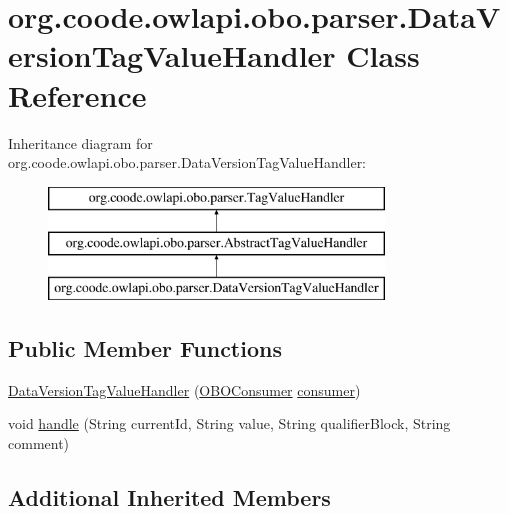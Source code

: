 \hypertarget{classorg_1_1coode_1_1owlapi_1_1obo_1_1parser_1_1_data_version_tag_value_handler}{\section{org.\-coode.\-owlapi.\-obo.\-parser.\-Data\-Version\-Tag\-Value\-Handler Class Reference}
\label{classorg_1_1coode_1_1owlapi_1_1obo_1_1parser_1_1_data_version_tag_value_handler}
}
Inheritance diagram for org.\-coode.\-owlapi.\-obo.\-parser.\-Data\-Version\-Tag\-Value\-Handler\-:\begin{figure}[H]
\begin{center}
\leavevmode
\includegraphics[height=3.000000cm]{classorg_1_1coode_1_1owlapi_1_1obo_1_1parser_1_1_data_version_tag_value_handler}
\end{center}
\end{figure}
\subsection*{Public Member Functions}
\begin{DoxyCompactItemize}
\item 
\hyperlink{classorg_1_1coode_1_1owlapi_1_1obo_1_1parser_1_1_data_version_tag_value_handler_acdaec8465947cb4a17bd4e76fa842c9a}{Data\-Version\-Tag\-Value\-Handler} (\hyperlink{classorg_1_1coode_1_1owlapi_1_1obo_1_1parser_1_1_o_b_o_consumer}{O\-B\-O\-Consumer} \hyperlink{classorg_1_1coode_1_1owlapi_1_1obo_1_1parser_1_1_abstract_tag_value_handler_ab27f1ff22d15640c5f81585f18265137}{consumer})
\item 
void \hyperlink{classorg_1_1coode_1_1owlapi_1_1obo_1_1parser_1_1_data_version_tag_value_handler_a055fd84037ae2b82afca6397c0fd719a}{handle} (String current\-Id, String value, String qualifier\-Block, String comment)
\end{DoxyCompactItemize}
\subsection*{Additional Inherited Members}


